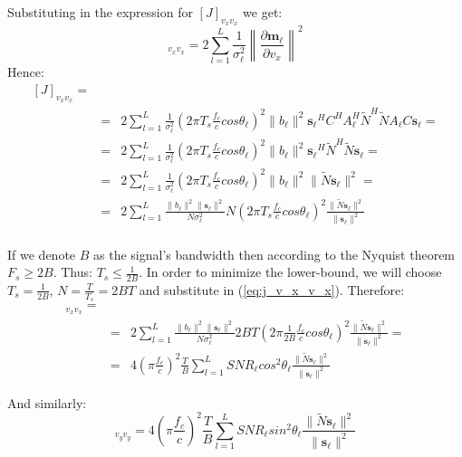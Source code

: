 \documentclass[10pt,a4paper]{report}
\begin{document}
Substituting in the expression for $[J]_{v_x v_x}$ we get:
\begin{equation}
[J]_{v_x v_x} = 2\sum_{l=1}^{L}\frac{1}{\sigma_\ell ^2}\left\|\frac{\partial \mathbf{m_\ell }}{\partial v_x}\right\|^2
\end{equation}
Hence:
\begin{eqnarray}
\label{eq:j_v_x_v_x}
[J]_{v_x v_x} = \\
&=& 2\sum_{l=1}^{L}\frac{1}{\sigma_\ell ^2}(2 \pi T_s \frac{f_c}{c}cos\theta_\ell )^2 \|b_\ell \|^2 \mathbf{s_\ell }^H C^H A_\ell ^H \tilde{N}^H  \tilde{N} A_\ell  C \mathbf{s_\ell } = \nonumber \\
&=& 2\sum_{l=1}^{L}\frac{1}{\sigma_\ell ^2}(2 \pi T_s \frac{f_c}{c}cos\theta_\ell )^2 \|b_\ell \|^2 \mathbf{s_\ell }^H \tilde{N}^H  \tilde{N} \mathbf{s_\ell } = \nonumber \\
&=& 2\sum_{l=1}^{L}\frac{1}{\sigma_\ell ^2}(2 \pi T_s \frac{f_c}{c}cos\theta_\ell )^2 \|b_\ell \|^2  \|\tilde{N} \mathbf{s_\ell }\|^2 = \nonumber \\
&=& 2\sum_{l=1}^{L}\frac{\|b_\ell \|^2 \|\mathbf{s_\ell }\|^2}{N \sigma_\ell ^2}N(2 \pi T_s \frac{f_c}{c}cos\theta_\ell )^2  \frac{\|\tilde{N} \mathbf{s_\ell }\|^2}{\|\mathbf{s_\ell }\|^2} \nonumber \\
\end{eqnarray}

If we denote $B$ as the signal's bandwidth then according to the Nyquist theorem ${F_s} \geq 2B$.
Thus: $T_s \leq \frac{1}{2B}$. In order to minimize the lower-bound, we will choose $T_s = \frac{1}{2B}$, $N=\frac{T}{T_s}=2BT$ and substitute in (\ref{eq:j_v_x_v_x}).
Therefore:
\begin{eqnarray}
[J]_{v_x v_x} = \\
&=& 2\sum_{l=1}^{L}\frac{\|b_\ell \|^2 \|\mathbf{s_\ell }\|^2}{N \sigma_\ell ^2} 2BT(2 \pi \frac{1}{2B} \frac{f_c}{c}cos\theta_\ell )^2 \frac{\|\tilde{N} \mathbf{s_\ell }\|^2}{\|\mathbf{s_\ell }\|^2} = \nonumber \\
&=&4 \left(\pi \frac{f_c}{c}\right)^2 \frac{T}{B}  \sum_{l=1}^{L}SNR_\ell  cos^2\theta_\ell  \frac{\|\tilde{N} \mathbf{s_\ell }\|^2}{\|\mathbf{s_\ell }\|^2}
\end{eqnarray}

And similarly:
\begin{equation}
[J]_{v_y v_y} =4 \left(\pi \frac{f_c}{c}\right)^2 \frac{T}{B}  \sum_{l=1}^{L}SNR_\ell  sin^2\theta_\ell  \frac{\|\tilde{N} \mathbf{s_\ell }\|^2}{\|\mathbf{s_\ell }\|^2}
\end{equation}
\end{document}

